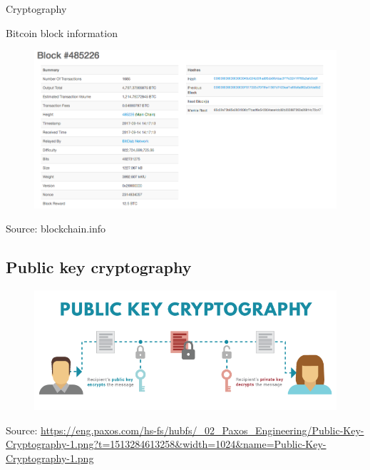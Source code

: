 \documentclass[9pt]{beamer}
\begin{document}

\begin{frame}{Cryptography}
	\begin{scriptsize}
		Bitcoin block information
	\end{scriptsize}
	\begin{figure}[]
		\centering
		\includegraphics  [width=4.in]{Images/block}
	\end{figure}
	\begin{tiny}
		Source: blockchain.info
	\end{tiny}
\end{frame}


\subsection{Public key cryptography}

\begin{frame}
	\begin{figure}[]
		\centering
		\includegraphics  [width=4.in]{Images/publickey1}
	\end{figure}
	\begin{tiny}
		Source: \href{https://eng.paxos.com/blockchain-separating-hype-from-substance-part-2}{https://eng.paxos.com/hs-fs/hubfs/\_02\_Paxos\_Engineering/Public-Key-Cryptography-1.png?t=1513284613258\&width=1024\&name=Public-Key-Cryptography-1.png}
	\end{tiny}
\end{frame}
\end{document}
